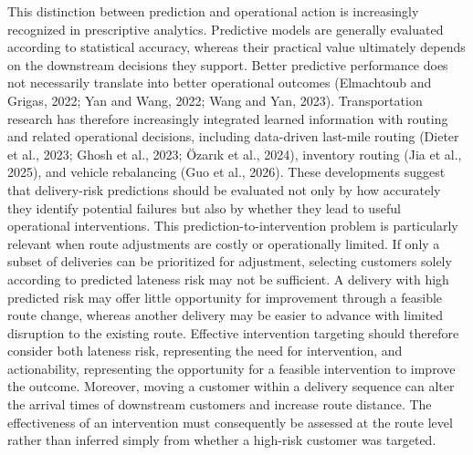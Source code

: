 \documentclass[11pt,a4paper]{article}
\begin{document}
This distinction between prediction and operational action is
increasingly recognized in prescriptive analytics. Predictive models are
generally evaluated according to statistical accuracy, whereas their
practical value ultimately depends on the downstream decisions they
support. Better predictive performance does not necessarily translate
into better operational outcomes (Elmachtoub and Grigas, 2022; Yan and
Wang, 2022; Wang and Yan, 2023). Transportation research has therefore
increasingly integrated learned information with routing and related
operational decisions, including data-driven last-mile routing (Dieter
et al., 2023; Ghosh et al., 2023; Özarık et al., 2024), inventory
routing (Jia et al., 2025), and vehicle rebalancing (Guo et al., 2026).
These developments suggest that delivery-risk predictions should be
evaluated not only by how accurately they identify potential failures
but also by whether they lead to useful operational interventions. This
prediction-to-intervention problem is particularly relevant when route
adjustments are costly or operationally limited. If only a subset of
deliveries can be prioritized for adjustment, selecting customers solely
according to predicted lateness risk may not be sufficient. A delivery
with high predicted risk may offer little opportunity for improvement
through a feasible route change, whereas another delivery may be easier
to advance with limited disruption to the existing route. Effective
intervention targeting should therefore consider both lateness risk,
representing the need for intervention, and actionability, representing
the opportunity for a feasible intervention to improve the outcome.
Moreover, moving a customer within a delivery sequence can alter the
arrival times of downstream customers and increase route distance. The
effectiveness of an intervention must consequently be assessed at the
route level rather than inferred simply from whether a high-risk
customer was targeted.
\end{document}
